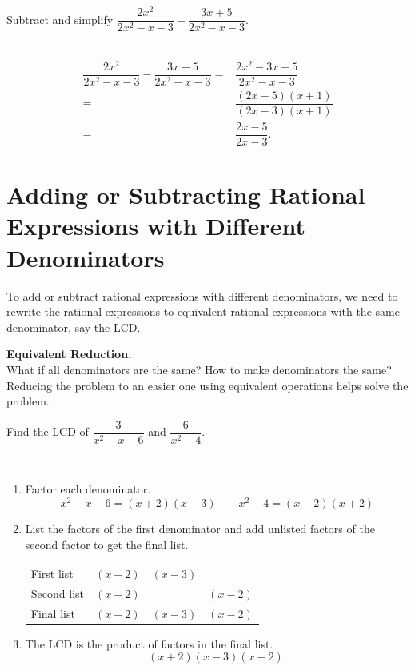 \documentclass[
  en,11pt]{elegantbook}
\newcommand{\size}[2]{{\fontsize{#1}{0}\selectfont#2}}
\newenvironment{rmdtip}{
	\vspace*{0.5\baselineskip}
	\par\noindent
	\makebox[-3pt][r]{\color{red!90}\size{12}{\HandRight}\,\,}
    \begin{tcolorbox}[
    enhanced,
    title={\textbf{\color{second}Tips}},
    title style={left color=blue!10!green!20!white,right color=yellow!20!blue!20!white},
    colback=cyan!10!white,
    ]
    \sffamily
}{
    \end{tcolorbox}
    \par\ignorespacesafterend
}
\let\BeginKnitrBlock\begin \let\EndKnitrBlock\end
\begin{document}
\BeginKnitrBlock{example}
\protect\hypertarget{exm:unnamed-chunk-45}{}{\label{exm:unnamed-chunk-45} }
Subtract and simplify \(\dfrac{2x^2}{2x^2-x-3}-\dfrac{3x+5}{2x^2-x-3}\).
\EndKnitrBlock{example}

\BeginKnitrBlock{solution}
{}\\

\[
\begin{aligned}
    \dfrac{2x^2}{2x^2-x-3}-\dfrac{3x+5}{2x^2-x-3}=&\dfrac{2x^2-3x-5}{2x^2-x-3}\\
    =&\dfrac{(2x-5)(x+1)}{(2x-3)(x+1)}\\
    =&\dfrac{2x-5}{2x-3}.
\end{aligned}
\]
\EndKnitrBlock{solution}

\hypertarget{adding-or-subtracting-rational-expressions-with-different-denominators}{%
\section{Adding or Subtracting Rational Expressions with Different Denominators}\label{adding-or-subtracting-rational-expressions-with-different-denominators}}

To add or subtract rational expressions with different denominators, we need to rewrite the rational expressions to equivalent rational expressions with the same denominator, say the LCD.

\begin{rmdtip}

\textbf{Equivalent Reduction.}\\
What if all denominators are the same? How to make denominators the same? Reducing the problem to an easier one using equivalent operations helps solve the problem.

\end{rmdtip}

\BeginKnitrBlock{example}
\protect\hypertarget{exm:unnamed-chunk-47}{}{\label{exm:unnamed-chunk-47} }
Find the LCD of \(\dfrac{3}{x^2-x-6}\) and \(\dfrac{6}{x^2-4}\).
\EndKnitrBlock{example}

\BeginKnitrBlock{solution}
{}\\

\begin{enumerate}
\def\labelenumi{\arabic{enumi}.}
\item
  Factor each denominator.
  \[
   x^2-x-6=(x+2)(x-3)\qquad x^2-4=(x-2)(x+2)
  \]
\item
  List the factors of the first denominator and add unlisted factors of the second factor to get the final list.

  \begin{longtable}[]{@{}lccc@{}}
  \toprule
  \endhead
  First list & \((x+2)\) & \((x-3)\) &\tabularnewline
  Second list & \((x+2)\) & & \((x-2)\)\tabularnewline
  Final list & \((x+2)\) & \((x-3)\) & \((x-2)\)\tabularnewline
  \bottomrule
  \end{longtable}
\item
  The LCD is the product of factors in the final list.\\
  \[(x+2)(x-3)(x-2).\]
\end{enumerate}
\EndKnitrBlock{solution}
\end{document}
